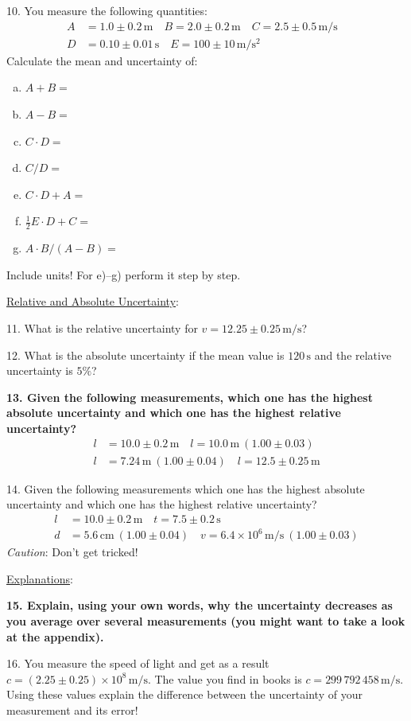 10. You measure the following quantities:
\begin{align*}
    A &= 1.0 \pm 0.2\,\mathrm{m}\quad B = 2.0 \pm 0.2\,\mathrm{m}\quad        C = 2.5 \pm 0.5\,\mathrm{m/s} \\
    D &= 0.10\pm 0.01\,\mathrm{s}\quad E = 100\pm 10\,\mathrm{m/s^2} &
\end{align*}
Calculate the mean and uncertainty of:
\begin{enumerate}[a)]
    \item $A+B=$
    \item $A-B=$
    \item $C\cdot D=$
    \item $C/D=$
    \item $C\cdot D + A=$
    \item $\frac{1}{2}E\cdot D + C=$
    \item $A\cdot B/(A-B)=$
\end{enumerate}
Include units! For e)--g) perform it step by step.\myskip

\noindent \underline{Relative and Absolute Uncertainty}:\myskip

11. What is the relative uncertainty for $v = 12.25 \pm 0.25\,\mathrm{m/s}$?\myskip

12. What is the absolute uncertainty if the mean value is $120\,\mathrm{s}$ and the relative uncertainty is $5\%$?\myskip

{\bf{13. Given the following measurements, which one has the highest absolute uncertainty and which one has the highest relative uncertainty?}}
\begin{align*}
    l &= 10.0 \pm 0.2\,\mathrm{m} \quad   l = 10.0\,\mathrm{m}\: (1.00 \pm 0.03)   \\
    l &= 7.24\,\mathrm{m}\: (1.00 \pm 0.04) \quad l = 12.5 \pm 0.25\,\mathrm{m}
\end{align*}

14. Given the following measurements which one has the highest absolute uncertainty and which one has the highest relative uncertainty?\myskip
\begin{align*}
    l &= 10.0\pm 0.2\,\mathrm{m} \quad t = 7.5\pm 0.2\,\mathrm{s} \\
    d &= 5.6\,\mathrm{cm}\:(1.00\pm 0.04) \quad v = 6.4\times 10^6\,\mathrm{m/s}\:(1.00\pm 0.03)
\end{align*}
\emph{Caution}: Don't get tricked!\myskip

\noindent \underline{Explanations}:\myskip

{\bf{15. Explain, using your own words, why the uncertainty decreases as you average over several measurements (you might want to take a look at the appendix).}} \myskip


16. You measure the speed of light and get as a result $c = (2.25 \pm 0.25)\times 10^8\,\mathrm{m/s}$. The value you find in books is $c = 299\, 792\, 458\,\mathrm{m/s}$.  Using these values explain the difference between the uncertainty of your measurement and its error!
\newpage
\thispagestyle{plain}

